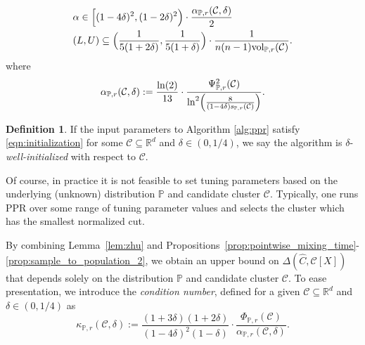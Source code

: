\documentclass[11pt,twoside]{article}
\theoremstyle{definition}
\newtheorem{definition}{Definition}
\newcommand{\Reals}{\mathbb{R}}
\newcommand{\1}{\mathbf{1}}
\newcommand{\Rd}{\Reals^d}
\newcommand{\mc}[1]{\mathcal{#1}}
\newcommand{\Pbb}{\mathbb{P}}
\newcommand{\wh}[1]{\widehat{#1}}
\newcommand{\vol}{\mathrm{vol}}
\begin{document}
\begin{equation}
\label{eqn:initialization}
\begin{aligned}
& \alpha \in \Bigl[(1 - 4\delta)^2, (1 - 2\delta)^2\Bigr) \cdot
\frac{\alpha_{\Pbb,r}(\mc{C},\delta)}{2} \\
& (L,U) \subseteq \Bigl(\frac{1}{5(1 + 2\delta)},\frac{1}{5(1 + \delta)}\Bigr) \cdot 
\frac{1}{n(n - 1)\vol_{\Pbb,r}(\mc{C})}.
\end{aligned}  
\end{equation}
where
\begin{equation}
\label{eqn:alpha_initialization}
\alpha_{\Pbb,r}(\mc{C},\delta) := \frac{\ln(2)}{13} \cdot \frac{\Psi_{\Pbb,r}^2(\mc{C})}{\ln^2\Bigl(\frac{8}{(1 - 4\delta)s_{\Pbb,r}(\mc{C})}\Bigr)}.
\end{equation}

\begin{definition}
	If the input parameters to Algorithm \ref{alg:ppr} satisfy \eqref{eqn:initialization} for some $\mc{C} \subseteq \Rd$ and $\delta \in (0,1/4)$, we say the algorithm is $\delta$-\emph{well-initialized} with respect to $\mc{C}$.
\end{definition}

Of course, in practice it is not feasible to set tuning parameters based on the 
underlying (unknown) distribution $\Pbb$ and candidate cluster $\mc{C}$. Typically, one runs PPR over some range of
tuning parameter values and selects the cluster which has the smallest
normalized cut. 

By combining Lemma~\ref{lem:zhu} and Propositions~\ref{prop:pointwise_mixing_time}-\ref{prop:sample_to_population_2}, we obtain an upper bound on $\Delta(\wh{C},\mc{C}[X])$ that depends solely on the distribution $\Pbb$ and candidate cluster $\mc{C}$. To ease presentation, we introduce the \emph{condition number}, defined for a given $\mc{C} \subseteq \Rd$ and $\delta \in (0,1/4)$ as
\begin{equation}
\label{eqn:condition_number}
\kappa_{\Pbb,r}(\mc{C},\delta) := \frac{(1 + 3\delta)(1+2\delta)}{(1 - 4\delta)^2(1 - \delta)} \cdot \frac{\Phi_{\Pbb,r}(\mc{C})}{\alpha_{\Pbb,r}(\mc{C},\delta)}.
\end{equation}
\end{document}

